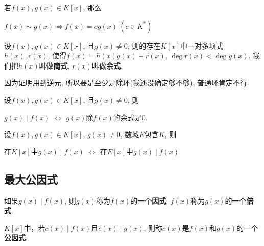 \begin{Proposition}
若$f(x), g(x) \in K[x]$, 那么
\begin{tightcenter}
$f(x) \sim g(x) \iff f(x) = c g(x)~(c \in K^*)$
\end{tightcenter}
\end{Proposition}

\begin{Theorem}[带余除法]
设$f(x), g(x) \in K[x]$, 且$g(x) \neq 0$, 则\;\;的存在$K[x]$中一对多项式$h(x), r(x)$,
使得$f(x) = h(x) g(x) + r(x)$, $\deg r(x) < \deg g(x)$. 我们把$h(x)$叫做\textbf{商式},
$r(x)$叫做\textbf{余式}.
\end{Theorem}

\begin{Note}
因为证明用到逆元, 所以要是至少是除环(我还没确定够不够), 普通环肯定不行.
\end{Note}

\begin{Corollary}
设$f(x), g(x) \in K[x]$, 且$g(x) \neq 0$, 则
\begin{tightcenter}
$g(x) \mid f(x)$ $\iff$ $g(x)$除$f(x)$的余式是$0$.
\end{tightcenter}
\end{Corollary}

\begin{Proposition}[整除性不随数域的扩大而改变]
设$f(x), g(x) \in K[x]$, $g(x) \neq 0$, 数域$E$包含$K$, 则
\begin{tightcenter}
在$K[x]$中$g(x) \mid f(x)$ $\iff$ 在$E[x]$中$g(x) \mid f(x)$ 
\end{tightcenter}
\end{Proposition}


\subsection{最大公因式}

\begin{Definition}[因式]
如果$g(x) \mid f(x)$, 则$g(x)$称为$f(x)$的一个\textbf{因式}, $f(x)$称为$g(x)$的一个\textbf{倍式}.
\end{Definition}

\begin{Definition}[公因式]
$K[x]$中，若$c(x) \mid f(x)$且$c(x) \mid g(x)$, 则称$c(x)$是$f(x)$和$g(x)$的一个\textbf{公因式}.
\end{Definition}

